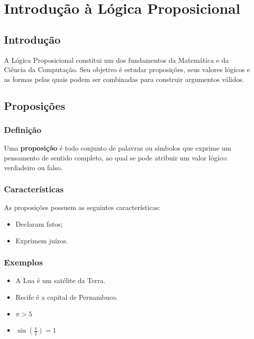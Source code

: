 \chapter{Introdução à Lógica Proposicional}

\section{Introdução}

A Lógica Proposicional constitui um dos fundamentos da Matemática e da Ciência da Computação. Seu objetivo é estudar proposições, seus valores lógicos e as formas pelas quais podem ser combinadas para construir argumentos válidos.

\section{Proposições}

\subsection{Definição}
 
Uma \textbf{proposição} é todo conjunto de palavras ou símbolos que exprime um pensamento de sentido completo, ao qual se pode atribuir um valor lógico: verdadeiro ou falso.

\subsection{Características}

As proposições possuem as seguintes características:

\begin{itemize}
    \item Declaram fatos;
    \item Exprimem juízos.
\end{itemize}

\subsection{Exemplos}

\begin{itemize}
    \item A Lua é um satélite da Terra.
    \item Recife é a capital de Pernambuco.
    \item $\pi > 5$
    \item $\sin\left(\frac{\pi}{2}\right) = 1$
\end{itemize}


